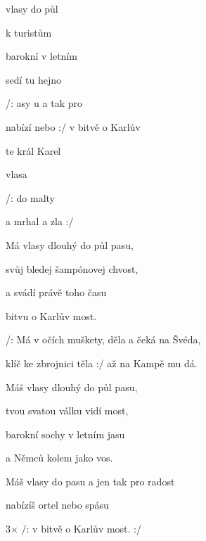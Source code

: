

\zs
{} vlasy  do půl 

{k tur}istům  

{barokní}  v letním 

{sedí} tu  hejno 

/: asy u a  tak pro 

{nabízí}  nebo  :/ v bitvě o Karlův 
\ks

\zr
{} te král Karel 

  vlasa

/:  do malty 

a mrhal  a   zla :/
\kr

\zs
Má vlasy dlouhý do půl pasu,

svůj bledej šampónovej chvost,

a svádí právě toho času

bitvu o Karlův most.


/: Má v očích muškety, děla a čeká na Švéda,

klíč ke zbrojnici těla :/ až na Kampě mu dá.
\ks


\zr \kr

\zs

Máš vlasy dlouhý do půl pasu,

tvou svatou válku vidí most,

barokní sochy v letním jasu

a Němců kolem jako vos.



Máš vlasy do pasu a jen tak pro radost

nabízíš ortel nebo spásu

3× /: v bitvě o Karlův most. :/
\ks

\kp





